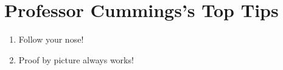 \section{Professor Cummings's Top Tips}

\begin{enumerate}
    \item Follow your nose!
    \item Proof by picture always works!
\end{enumerate}